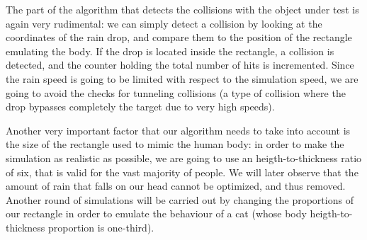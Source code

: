 \documentclass[12pt]{report}
\begin{document}
            The part of the algorithm that detects the collisions with the object under test is again very rudimental: we can simply detect a collision by looking at the coordinates of the rain drop, and compare them to the position of the rectangle emulating the body. If the drop is located inside the rectangle, a collision is detected, and the counter holding the total number of hits is incremented. Since the rain speed is going to be limited with respect to the simulation speed, we are going to avoid the checks for tunneling collisions (a type of collision where the drop bypasses completely the target due to very high speeds).

            Another very important factor that our algorithm needs to take into account is the size of the rectangle used to mimic the human body: in order to make the simulation as realistic as possible, we are going to use an heigth-to-thickness ratio of six, that is valid for the vast majority of people. We will later observe that the amount of rain that falls on our head cannot be optimized, and thus removed. Another round of simulations will be carried out by changing the proportions of our rectangle in order to emulate the behaviour of a cat (whose body heigth-to-thickness proportion is one-third). 
            
\end{document}
